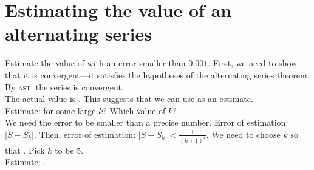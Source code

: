 
\newpage

\section{Estimating the value of an alternating series}
Estimate the value of  with an error smaller than \(0.001\).
First, we need to show that it is convergent---it satisfies the hypotheses of the alternating series theorem. By \textsc{ast}, the series is convergent. \\
The actual value is . This suggests that we can use  as an estimate. \\
Estimate:  for some large \(k\)? Which value of \(k\)? \\
We need the error to be smaller than a precise number. Error of estimation: \(\vert S - S_k \vert\).
Then, error of estimation: \(\vert S - S_k \vert < \frac{1}{(k+1)^4}\). We need to choose \(k\) so that . Pick \(k\) to be \(5\). \\
Estimate: .

